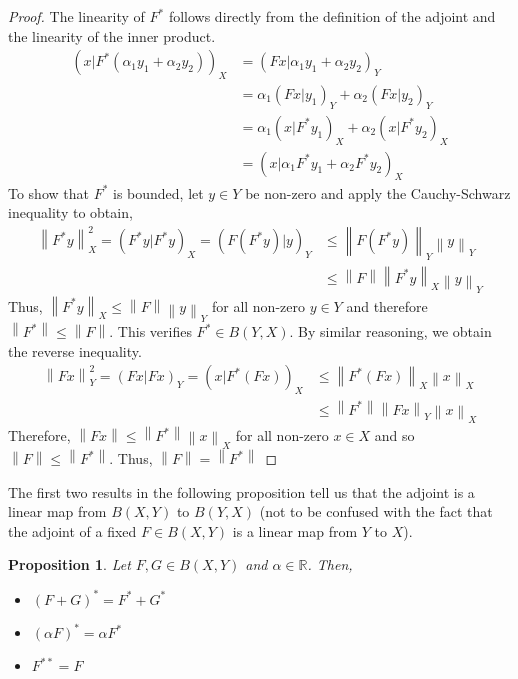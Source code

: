 \documentclass[12pt]{article}
\newcommand*{\norm}[1]{\left\lVert#1\right\rVert}
\newtheorem{prop}{Proposition}
\begin{document}
\begin{proof} 
The linearity of $F^*$ follows directly from the definition of the adjoint and the linearity of the inner product. 
\begin{align*} 
(x|F^*(\alpha_1 y_1 + \alpha_2 y_2))_X &= (Fx|\alpha_1 y_1 + \alpha_2 y_2)_Y \\
                                                               &= \alpha_1(Fx|y_1)_Y + \alpha_2(Fx|y_2)_Y \\
                                                               &= \alpha_1(x|F^*y_1)_X + \alpha_2(x|F^*y_2)_X \\
                                                               &= (x|\alpha_1 F^*y_1 + \alpha_2 F^*y_2)_X
\end{align*} 
To show that $F^*$ is bounded, let $y \in Y$ be non-zero and apply the Cauchy-Schwarz inequality to obtain,
\begin{align*} 
\norm{F^*y}^2_X = (F^*y|F^*y)_X = (F(F^*y)|y)_Y &\leq \norm{F(F^*y)}_Y\norm{y}_Y \\
                                                                               &\leq \norm{F}\norm{F^*y}_X\norm{y}_Y
\end{align*}
Thus, $\norm{F^*y}_X \leq \norm{F}\norm{y}_Y$ for all non-zero $y \in Y$ and therefore $\norm{F^*} \leq \norm{F}$. 
This verifies $F^* \in B(Y, X)$. By similar reasoning, we obtain the reverse inequality. 
\begin{align*} 
\norm{Fx}^2_Y = (Fx|Fx)_Y = (x|F^*(Fx))_X &\leq \norm{F^*(Fx)}_X\norm{x}_X \\
                                                                      &\leq \norm{F^*}\norm{Fx}_Y\norm{x}_X
\end{align*}
Therefore, $\norm{Fx} \leq \norm{F^*}\norm{x}_X$ for all non-zero $x \in X$ and so $\norm{F} \leq \norm{F^*}$. 
Thus, $\norm{F} = \norm{F^*}$
\end{proof} 

The first two results in the following proposition tell us that the adjoint is a linear map from $B(X, Y)$
to $B(Y, X)$ (not to be confused with the fact that the adjoint of a fixed $F \in B(X, Y)$ is a linear map 
from $Y$ to $X$).

\begin{prop} 
Let $F, G \in B(X, Y)$ and $\alpha \in \mathbb{R}$. Then,
\begin{itemize}
\item $(F + G)^* = F^* + G^*$
\item $(\alpha F)^* = \alpha F^*$
\item $F^{**} = F$
\end{itemize}  
\end{prop}
\end{document}
